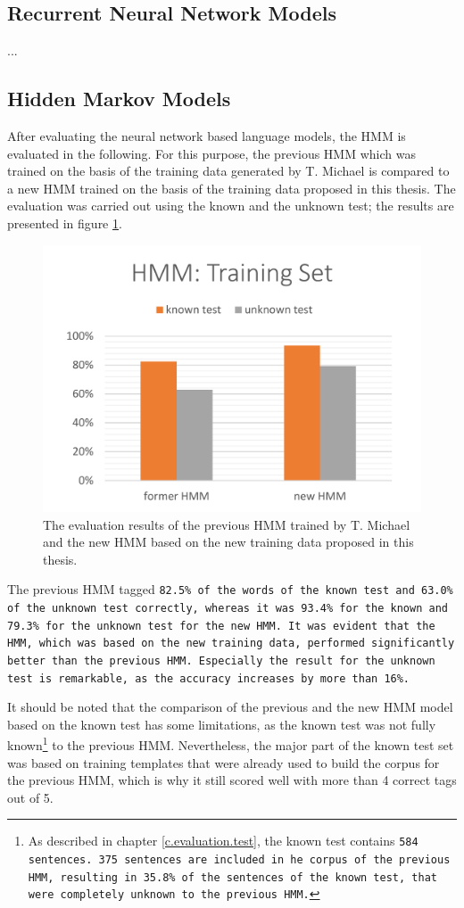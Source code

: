 \subsection{Recurrent Neural Network Models}\label{c.evaluation.results.rnn}
...

\subsection{Hidden Markov Models}\label{c.evaluation.results.hmm}
After evaluating the neural network based language models, the HMM is evaluated in the following. For this purpose, the previous HMM which was trained on the basis of the training data generated by T. Michael \cite{michael2016} is compared to a new HMM trained on the basis of the training data proposed in this thesis. The evaluation was carried out using the known and the unknown test; the results are presented in figure \ref{f.evaluation.hmm}.

\begin{figure}[H]
	\centering\includegraphics[width=.7\textwidth]{images/evaluation_hmm}
	\caption[HMM Evaluation]{The evaluation results of the previous HMM trained by T. Michael \cite{michael2016} and the new HMM based on the new training data proposed in this thesis.}
	\label{f.evaluation.hmm}
\end{figure}

The previous HMM tagged \tt{82.5\%} of the words of the known test and \tt{63.0\%} of the unknown test correctly, whereas it was \tt{93.4\%} for the known and \tt{79.3\%} for the unknown test for the new HMM. It was evident that the HMM, which was based on the new training data, performed significantly better than the previous HMM. Especially the result for the unknown test is remarkable, as the accuracy increases by more than \tt{16\%}.

It should be noted that the comparison of the previous and the new HMM model based on the known test has some limitations, as the known test was not fully known\footnote{As described in chapter \ref{c.evaluation.test}, the known test contains \tt{584} sentences. \tt{375} sentences are included in he corpus of the previous HMM, resulting in \tt{35.8\%} of the sentences of the known test, that were completely unknown to the previous HMM.} to the previous HMM. Nevertheless, the major part of the known test set was based on training templates that were already used to build the corpus for the previous HMM, which is why it still scored well with more than 4 correct tags out of 5.

